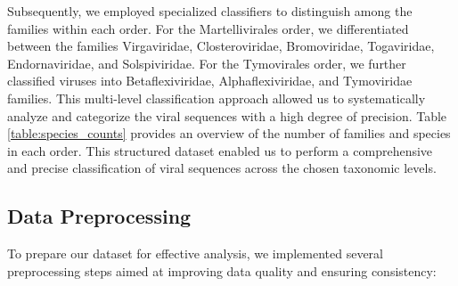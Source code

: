 Subsequently, we employed specialized classifiers to distinguish among the families within each order. For the Martellivirales order, we differentiated between the families Virgaviridae, Closteroviridae, Bromoviridae, Togaviridae, Endornaviridae, and Solspiviridae. For the Tymovirales order, we further classified viruses into Betaflexiviridae, Alphaflexiviridae, and Tymoviridae families. This multi-level classification approach allowed us to systematically analyze and categorize the viral sequences with a high degree of precision. Table \ref{table:species_counts} provides an overview of the number of families and species in each order. This structured dataset enabled us to perform a comprehensive and precise classification of viral sequences across the chosen taxonomic levels.

\subsection{Data Preprocessing} 

To prepare our dataset for effective analysis, we implemented several preprocessing steps aimed at improving data quality and ensuring consistency:

